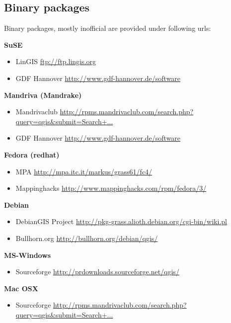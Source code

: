 \subsection{Binary packages}\label{label_binaries}

Binary packages, mostly inofficial are provided under following urls:

\textbf{SuSE}

\begin{itemize}
\item LinGIS \url{ftp://ftp.lingis.org}
\item GDF Hannover \url{http://www.gdf-hannover.de/software}
\end{itemize}

\textbf{Mandriva (Mandrake)}

\begin{itemize}
\item Mandrivaclub \url{http://rpms.mandrivaclub.com/search.php?query=qgis&submit=Search+...}
\item GDF Hannover \url{http://www.gdf-hannover.de/software}
\end{itemize}

\textbf{Fedora (redhat)}

\begin{itemize}
\item MPA \url{http://mpa.itc.it/markus/grass61/fc4/}
\item Mappinghacks \url{http://www.mappinghacks.com/rpm/fedora/3/}
\end{itemize}

\textbf{Debian}

\begin{itemize}
\item DebianGIS Project \url{http://pkg-grass.alioth.debian.org/cgi-bin/wiki.pl}
\item Bullhorn.org \url{http://bullhorn.org/debian/qgis/}
\end{itemize}

\textbf{MS-Windows}

\begin{itemize}
\item Sourceforge \url{http://prdownloads.sourceforge.net/qgis/}
\end{itemize}

\textbf{Mac OSX}

\begin{itemize}
\item Sourceforge \url{http://rpms.mandrivaclub.com/search.php?query=qgis&submit=Search+...}
\end{itemize}

